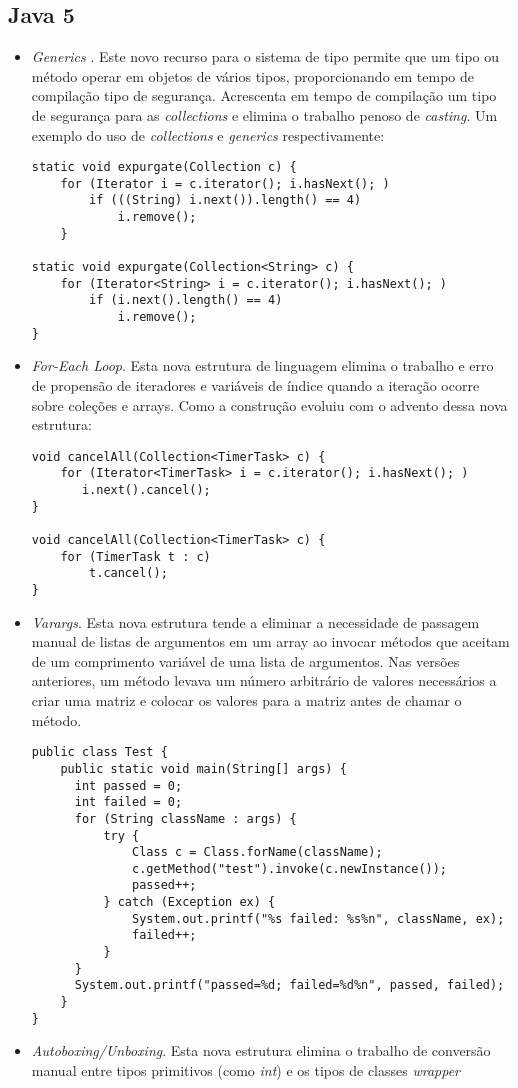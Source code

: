 	\subsection {Java 5}
	  \begin{itemize}
		  \item {\it Generics} \cite{JSE8_Enhancements, OracleGenerics,Parnin:2011:JGA:1985441.1985446}. Este novo recurso para o sistema de tipo permite que um tipo ou método operar em objetos de vários tipos, proporcionando em tempo de compilação tipo de segurança. Acrescenta em tempo de compilação um tipo de segurança para as {\it collections} e elimina o trabalho penoso de {\it casting}. Um exemplo do uso de {\it collections} e {\it generics} respectivamente:
\begin{lstlisting}
static void expurgate(Collection c) {
	for (Iterator i = c.iterator(); i.hasNext(); )
		if (((String) i.next()).length() == 4)
			i.remove();
	}
	
static void expurgate(Collection<String> c) {
	for (Iterator<String> i = c.iterator(); i.hasNext(); )
		if (i.next().length() == 4)
			i.remove();
}
\end{lstlisting}
		  
		\item {\it For-Each Loop}. Esta nova estrutura de linguagem elimina o trabalho e erro de propensão de iteradores e variáveis de índice quando a iteração ocorre sobre coleções e arrays. Como a construção evoluiu com o advento dessa nova estrutura:
	
\begin{lstlisting}
void cancelAll(Collection<TimerTask> c) {
	for (Iterator<TimerTask> i = c.iterator(); i.hasNext(); )
	   i.next().cancel();
}
	
void cancelAll(Collection<TimerTask> c) {
	for (TimerTask t : c)
		t.cancel();
}
\end{lstlisting}
	  
	  \clearpage
	  \item {\it Varargs}. Esta nova estrutura tende a eliminar a necessidade de passagem manual de listas de argumentos em um array ao invocar métodos que aceitam de um comprimento variável de uma lista de argumentos. Nas versões anteriores, um método levava um número arbitrário de valores necessários a  criar uma matriz e colocar os valores para a matriz antes de chamar o método.


\begin{lstlisting}
public class Test {
	public static void main(String[] args) {
	  int passed = 0;
	  int failed = 0;
	  for (String className : args) {
	      try {
	          Class c = Class.forName(className);
	          c.getMethod("test").invoke(c.newInstance());
	          passed++;
	      } catch (Exception ex) {
	          System.out.printf("%s failed: %s%n", className, ex);
	          failed++;
	      }
	  }
	  System.out.printf("passed=%d; failed=%d%n", passed, failed);
	}
}
\end{lstlisting}
 
	  \item {\it Autoboxing/Unboxing}. Esta nova estrutura elimina o trabalho de conversão manual entre tipos primitivos (como {\it int}) e os tipos de classes {\it wrapper}
  \end{itemize}
  
